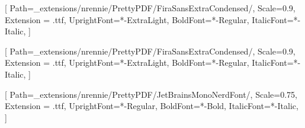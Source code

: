 \setsansfont{FiraSansExtraCondensed}[
    Path=_extensions/nrennie/PrettyPDF/FiraSansExtraCondensed/,
    Scale=0.9,
    Extension = .ttf,
    UprightFont=*-ExtraLight,
    BoldFont=*-Regular,
    ItalicFont=*-Italic,
    ]

\setmainfont{FiraSansExtraCondensed}[
    Path=_extensions/nrennie/PrettyPDF/FiraSansExtraCondensed/,
    Scale=0.9,
    Extension = .ttf,
    UprightFont=*-ExtraLight,
    BoldFont=*-Regular,
    ItalicFont=*-Italic,
    ]

\setmonofont{JetBrainsMonoNerdFont}[
    Path=_extensions/nrennie/PrettyPDF/JetBrainsMonoNerdFont/,
    Scale=0.75,
    Extension = .ttf,
    UprightFont=*-Regular,
    BoldFont=*-Bold,
    ItalicFont=*-Italic,
]
